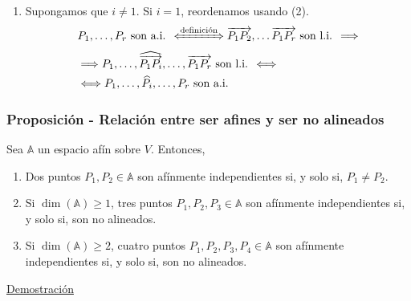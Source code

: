 \documentclass[12pt, a4paper, ones, notitlepage, openany,titlepage]{article}
\newcommand{\demostracion}{\noindent\underline{Demostración}}
\begin{document}
\begin{enumerate}[label=(\arabic*)]
	\item Supongamos que $i \neq 1$. Si $i = 1$, reordenamos usando (2).
	$$
	\begin{aligned}
		& P_1, \ldots, P_r \text{ son a.i. } \xLeftrightarrow{\text{definición}} \overrightarrow{P_1 P_2}, \ldots \overrightarrow{P_1 P_r} \text{ son l.i. } \Longrightarrow \\
		& \Longrightarrow P_1, \ldots, \widehat{\overrightarrow{P_1 P_i}}, \ldots, \overrightarrow{P_1 P_r} \text{ son l.i. } \Longleftrightarrow \\
		& \Longleftrightarrow P_1, \ldots, \widehat{P_i}, \ldots, P_r \text{ son a.i. }
	\end{aligned}
	$$
\end{enumerate}

\subsubsection{Proposición - Relación entre ser afines y ser no alineados}
\noindent Sea $\mathbb{A}$ un espacio afín sobre $V$. Entonces,
\begin{enumerate}[label=(\arabic*)]
	\item Dos puntos $P_1, P_2 \in \mathbb{A}$ son afínmente independientes si, y solo si, $P_1 \neq P_2$.
	\item Si $\dim(\mathbb{A}) \ge 1$, tres puntos $P_1, P_2, P_3 \in \mathbb{A}$ son afínmente independientes si, y solo si, son no alineados.
	\item Si $\dim(\mathbb{A}) \ge 2$, cuatro puntos $P_1, P_2, P_3, P_4 \in \mathbb{A}$ son afínmente independientes si, y solo si, son no alineados.
\end{enumerate}
\demostracion
\end{document}
